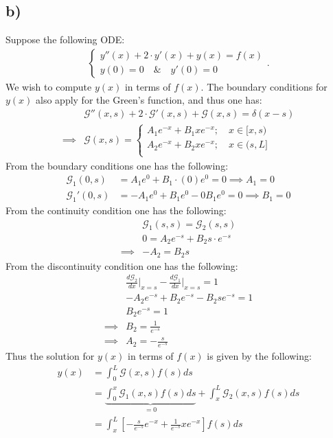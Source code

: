 \documentclass{article}
\begin{document}
\subsection*{b)}
Suppose the following ODE:
\begin{align*}
    \begin{cases}
        y''(x) + 2\cdot y'(x) + y(x) = f(x)\\
        y(0) = 0\quad \&\quad y'(0) = 0
    \end{cases}.
\end{align*}We wish to compute $y(x)$ in terms of $f(x)$. The boundary conditions for $y(x)$ also apply for the Green's function, and thus one has:
\begin{align*}
    &\mathcal{G}''(x,s) + 2\cdot \mathcal{G}'(x,s) + \mathcal{G}(x,s) = \delta(x-s)\\
    \implies &\mathcal{G}(x,s) = 
    \begin{cases}
        A_1e^{-x} + B_1xe^{-x}; \quad x \in[x,s)\\
        A_2e^{-x} + B_2xe^{-x}; \quad x \in(s,L]\\
    \end{cases}
\end{align*}
From the boundary conditions one has the following:
\begin{align*}
    \mathcal{G}_1(0,s) &= A_1e^{0} + B_1\cdot(0)e^{0} = 0\implies A_1 =0\\
    \mathcal{G}_1'(0,s) &= -A_1e^{0} + B_1e^{0} - 0 B_1e^{0} = 0\implies B_1 = 0
\end{align*}
From the continuity condition one has the following:
\begin{align*}
    &\mathcal{G}_1(s,s) = \mathcal{G}_2(s,s)\\
    &0 = A_2e^{-s} + B_2s\cdot e^{-s}\\
    \implies &-A_2 = B_2s
\end{align*}
From the discontinuity condition one has the following:
\begin{align*}
    &\frac{d\mathcal{G}_2}{dx}\Bigg|_{x = s} - \frac{d\mathcal{G}_1}{dx}\Bigg|_{x = s} =1\\
    &-A_2e^{-s} + B_2e^{-s} - B_2se^{-s} = 1\\
    &B_2e^{-s} = 1\\
    \implies & B_2 = \frac{1}{e^{-s}}\\
    \implies & A_2 = -\frac{s}{e^{-s}}
\end{align*}
Thus the solution for $y(x)$ in terms of $f(x)$ is given by the following:
\begin{align*}
    y(x) &= \int_0^L\mathcal{G}(x,s)f(s)ds\\
    &= \underbrace{\int_0^x\mathcal{G}_1(x,s)f(s)ds}_{=0} + \int_x^L\mathcal{G}_2(x,s)f(s)ds\\
    &=\int_x^L \left[-\frac{s}{e^{-s}}e^{-x} + \frac{1}{e^{-s}}xe^{-x}\right]f(s)ds\\
\end{align*}
\end{document}
